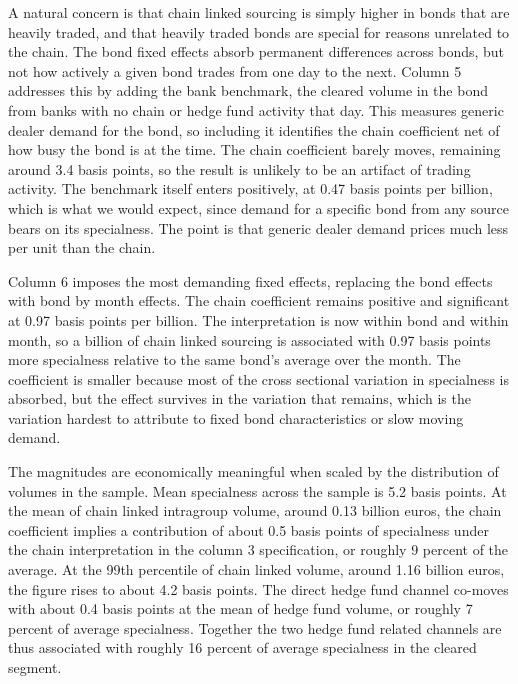 \documentclass[english, 11pt, oneside, legal]{article}
\begin{document}
A natural concern is that chain linked sourcing is simply higher in bonds that are heavily traded, and that heavily traded bonds are special for reasons unrelated to the chain. The bond fixed effects absorb permanent differences across bonds, but not how actively a given bond trades from one day to the next. Column 5 addresses this by adding the bank benchmark, the cleared volume in the bond from banks with no chain or hedge fund activity that day. This measures generic dealer demand for the bond, so including it identifies the chain coefficient net of how busy the bond is at the time. The chain coefficient barely moves, remaining around 3.4 basis points, so the result is unlikely to be an artifact of trading activity. The benchmark itself enters positively, at 0.47 basis points per billion, which is what we would expect, since demand for a specific bond from any source bears on its specialness. The point is that generic dealer demand prices much less per unit than the chain.

Column 6 imposes the most demanding fixed effects, replacing the bond effects with bond by month effects. The chain coefficient remains positive and significant at 0.97 basis points per billion. The interpretation is now within bond and within month, so a billion of chain linked sourcing is associated with 0.97 basis points more specialness relative to the same bond's average over the month. The coefficient is smaller because most of the cross sectional variation in specialness is absorbed, but the effect survives in the variation that remains, which is the variation hardest to attribute to fixed bond characteristics or slow moving demand.

The magnitudes are economically meaningful when scaled by the distribution of volumes in the sample. Mean specialness across the sample is 5.2 basis points. At the mean of chain linked intragroup volume, around 0.13 billion euros, the chain coefficient implies a contribution of about 0.5 basis points of specialness under the chain interpretation in the column 3 specification, or roughly 9 percent of the average. At the 99th percentile of chain linked volume, around 1.16 billion euros, the figure rises to about 4.2 basis points. The direct hedge fund channel co-moves with about 0.4 basis points at the mean of hedge fund volume, or roughly 7 percent of average specialness. Together the two hedge fund related channels are thus associated with roughly 16 percent of average specialness in the cleared segment. 
\end{document}
